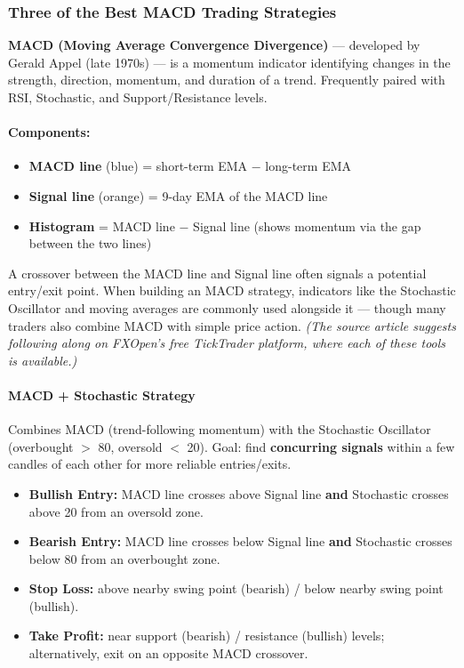 \documentclass[12pt,openany]{book}
\begin{document}
\subsubsection{Three of the Best MACD Trading Strategies}

\textbf{MACD (Moving Average Convergence Divergence)} --- developed by Gerald Appel (late 1970s) --- is a momentum indicator identifying changes in the strength, direction, momentum, and duration of a trend. Frequently paired with RSI, Stochastic, and Support/Resistance levels.

\paragraph{Components:}
\begin{itemize}[leftmargin=*]
    \item \textbf{MACD line} (blue) = short-term EMA \(-\) long-term EMA
    \item \textbf{Signal line} (orange) = 9-day EMA of the MACD line
    \item \textbf{Histogram} = MACD line \(-\) Signal line (shows momentum via the gap between the two lines)
\end{itemize}

A crossover between the MACD line and Signal line often signals a potential entry/exit point. When building an MACD strategy, indicators like the Stochastic Oscillator and moving averages are commonly used alongside it --- though many traders also combine MACD with simple price action. \emph{(The source article suggests following along on FXOpen's free TickTrader platform, where each of these tools is available.)}

\paragraph{MACD + Stochastic Strategy}

Combines MACD (trend-following momentum) with the Stochastic Oscillator (overbought \(>\) 80, oversold \(<\) 20). Goal: find \textbf{concurring signals} within a few candles of each other for more reliable entries/exits.

\begin{itemize}[leftmargin=*]
    \item \textbf{Bullish Entry:} MACD line crosses above Signal line \textbf{and} Stochastic crosses above 20 from an oversold zone.
    \item \textbf{Bearish Entry:} MACD line crosses below Signal line \textbf{and} Stochastic crosses below 80 from an overbought zone.
    \item \textbf{Stop Loss:} above nearby swing point (bearish) / below nearby swing point (bullish).
    \item \textbf{Take Profit:} near support (bearish) / resistance (bullish) levels; alternatively, exit on an opposite MACD crossover.
\end{itemize}
\end{document}

